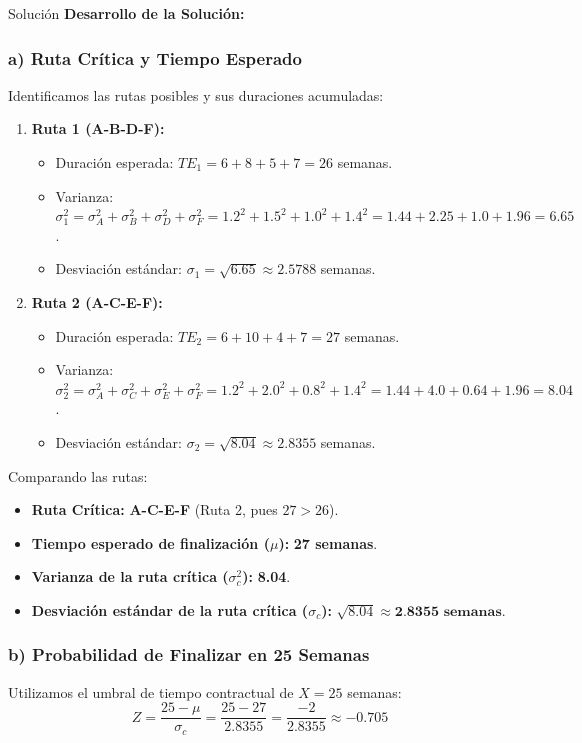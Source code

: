 \documentclass[11pt, a4paper]{article}
\begin{document}
  \medskip
  \begin{ejercicio}{Solución}
  \textbf{Desarrollo de la Solución:}

  \subsubsection*{a) Ruta Crítica y Tiempo Esperado}
  Identificamos las rutas posibles y sus duraciones acumuladas:
  \begin{enumerate}
    \item \textbf{Ruta 1 (A-B-D-F):}
    \begin{itemize}
      \item Duración esperada: $TE_{1} = 6 + 8 + 5 + 7 = 26$ semanas.
      \item Varianza: $\sigma_1^2 = \sigma_A^2 + \sigma_B^2 + \sigma_D^2 + \sigma_F^2 = 1.2^2 + 1.5^2 + 1.0^2 + 1.4^2 = 1.44 + 2.25 + 1.0 + 1.96 = 6.65$.
      \item Desviación estándar: $\sigma_1 = \sqrt{6.65} \approx 2.5788$ semanas.
    \end{itemize}

    \item \textbf{Ruta 2 (A-C-E-F):}
    \begin{itemize}
      \item Duración esperada: $TE_{2} = 6 + 10 + 4 + 7 = 27$ semanas.
      \item Varianza: $\sigma_2^2 = \sigma_A^2 + \sigma_C^2 + \sigma_E^2 + \sigma_F^2 = 1.2^2 + 2.0^2 + 0.8^2 + 1.4^2 = 1.44 + 4.0 + 0.64 + 1.96 = 8.04$.
      \item Desviación estándar: $\sigma_2 = \sqrt{8.04} \approx 2.8355$ semanas.
    \end{itemize}
  \end{enumerate}

  Comparando las rutas:
  \begin{itemize}
    \item \textbf{Ruta Crítica:} \textbf{A-C-E-F} (Ruta 2, pues $27 > 26$).
    \item \textbf{Tiempo esperado de finalización ($\mu$):} \textbf{27 semanas}.
    \item \textbf{Varianza de la ruta crítica ($\sigma_c^2$):} \textbf{8.04}.
    \item \textbf{Desviación estándar de la ruta crítica ($\sigma_c$):} $\sqrt{8.04} \approx \textbf{2.8355 semanas}$.
  \end{itemize}

  \subsubsection*{b) Probabilidad de Finalizar en 25 Semanas}
  Utilizamos el umbral de tiempo contractual de $X = 25$ semanas:
  \begin{equation*}
    Z = \frac{25 - \mu}{\sigma_c} = \frac{25 - 27}{2.8355} = \frac{-2}{2.8355} \approx -0.705
  \end{equation*}


\end{ejercicio}
\end{document}
